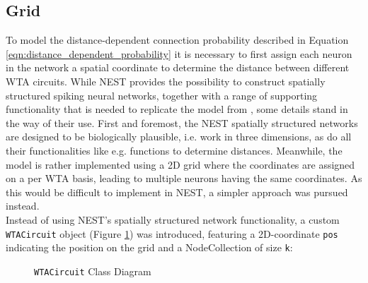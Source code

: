 \subsection{Grid}
To model the distance-dependent connection probability described in Equation \ref{eqn:distance_dependent_probability} it is necessary to first assign each neuron in the network a spatial coordinate to determine the distance between different WTA circuits. While NEST provides the possibility to construct spatially structured spiking neural networks, together with a range of supporting functionality that is needed to replicate the model from \parencite{klampfl_maass_2013}, some details stand in the way of their use. First and foremost, the NEST spatially structured networks are designed to be biologically plausible, i.e. work in three dimensions, as do all their functionalities like e.g. functions to determine distances. Meanwhile, the \parencite{klampfl_maass_2013} model is rather implemented using a 2D grid where the coordinates are assigned on a per WTA basis, leading to multiple neurons having the same coordinates. As this would be difficult to implement in NEST, a simpler approach was pursued instead.\\
Instead of using NEST's spatially structured network functionality, a custom \texttt{WTACircuit} object (Figure \ref{fig:object_wta_circuit}) was introduced, featuring a 2D-coordinate \texttt{pos} indicating the position on the grid and a NodeCollection of size \texttt{k}:\\
\begin{figure}[htbp]
\centering
{}
\caption{\texttt{WTACircuit} Class Diagram} \label{fig:object_wta_circuit}
\end{figure}
\\
